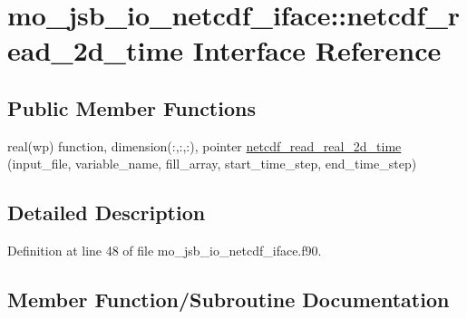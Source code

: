 \hypertarget{interfacemo__jsb__io__netcdf__iface_1_1netcdf__read__2d__time}{}\section{mo\+\_\+jsb\+\_\+io\+\_\+netcdf\+\_\+iface\+:\+:netcdf\+\_\+read\+\_\+2d\+\_\+time Interface Reference}
\label{interfacemo__jsb__io__netcdf__iface_1_1netcdf__read__2d__time}
\subsection*{Public Member Functions}
\begin{DoxyCompactItemize}
\item 
real(wp) function, dimension(\+:,\+:,\+:), pointer \hyperlink{interfacemo__jsb__io__netcdf__iface_1_1netcdf__read__2d__time_aa7e041f066b09f5950869c5369a1f074}{netcdf\+\_\+read\+\_\+real\+\_\+2d\+\_\+time} (input\+\_\+file, variable\+\_\+name, fill\+\_\+array, start\+\_\+time\+\_\+step, end\+\_\+time\+\_\+step)
\end{DoxyCompactItemize}


\subsection{Detailed Description}


Definition at line 48 of file mo\+\_\+jsb\+\_\+io\+\_\+netcdf\+\_\+iface.\+f90.



\subsection{Member Function/\+Subroutine Documentation}
\hypertarget{interfacemo__jsb__io__netcdf__iface_1_1netcdf__read__2d__time_aa7e041f066b09f5950869c5369a1f074}{}
